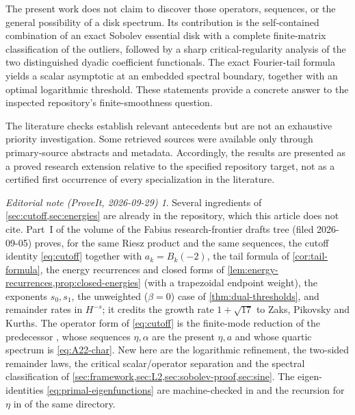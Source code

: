 \documentclass[11pt,a4paper]{article}
\theoremstyle{definition}
\theoremstyle{remark}
\newtheorem*{ednote}{Editorial note (ProveIt, 2026-09-29)}
\numberwithin{equation}{section}
\begin{document}
The present work does not claim to discover those operators, sequences, or
the general possibility of a disk spectrum. Its contribution is the
self-contained combination of an exact Sobolev essential disk with a
complete finite-matrix classification of the outliers, followed by a sharp
critical-regularity analysis of the two distinguished dyadic coefficient
functionals. The exact Fourier-tail formula yields a scalar asymptotic at an
embedded spectral boundary, together with an optimal logarithmic threshold.
These statements provide a concrete answer to the inspected repository's
finite-smoothness question.

The literature checks establish relevant antecedents but are not an exhaustive
priority investigation. Some retrieved sources were available only through
primary-source abstracts and metadata. Accordingly, the results are presented
as a proved research extension relative to the specified repository target,
not as a certified first occurrence of every specialization in the literature.
\begin{ednote}
Several ingredients of \cref{sec:cutoff,sec:energies} are already in the
repository, which this article does not cite. Part~I of the volume
 of the Fabius
research-frontier drafts tree (filed 2026-09-05) proves, for the same Riesz product and the same
sequences, the cutoff identity \eqref{eq:cutoff} together with
$a_k=B_k(-2)$, the tail formula of \cref{cor:tail-formula}, the energy
recurrences and closed forms of
\cref{lem:energy-recurrences,prop:closed-energies} (with a trapezoidal
endpoint weight), the exponents $s_0,s_1$, the unweighted ($\beta=0$) case
of \cref{thm:dual-thresholds}, and remainder rates in $H^{-s}$; it credits
the growth rate $1+\sqrt{17}$ to Zaks, Pikovsky and Kurths. The operator
form of \eqref{eq:cutoff} is the finite-mode reduction of the predecessor
\cite{repo-spectral}, whose sequences $\eta,\alpha$ are the present
$\eta,a$ and whose quartic spectrum is \eqref{eq:A22-char}. New here are
the logarithmic refinement, the two-sided remainder laws, the critical
scalar/operator separation and the spectral classification of
\cref{sec:framework,sec:L2,sec:sobolev-proof,sec:sine}. The
eigen-identities \eqref{eq:primal-eigenfunctions} are machine-checked in
and the recursion for $\eta$ in 
of the same directory.
\end{ednote}
\end{document}
